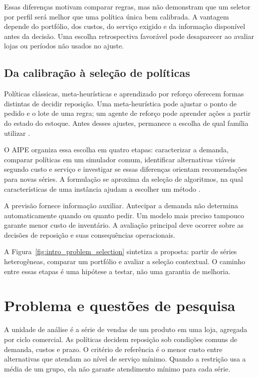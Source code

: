 Essas diferenças motivam comparar regras, mas não demonstram que um seletor por perfil será melhor que uma política única bem calibrada. A vantagem depende do portfólio, dos custos, do serviço exigido e da informação disponível antes da decisão. Uma escolha retrospectiva favorável pode desaparecer ao avaliar lojas ou períodos não usados no ajuste.

\subsection{Da calibração à seleção de políticas}

Políticas clássicas, meta-heurísticas e aprendizado por reforço oferecem formas distintas de decidir reposição. Uma meta-heurística pode ajustar o ponto de pedido e o lote de uma regra; um agente de reforço pode aprender ações a partir do estado do estoque. Antes desses ajustes, permanece a escolha de qual família utilizar \citep{Syntetos2009InventoryForecastingReview,Boute2022DRLInventoryRoadmap}.

O AIPE organiza essa escolha em quatro etapas: caracterizar a demanda, comparar políticas em um simulador comum, identificar alternativas viáveis segundo custo e serviço e investigar se essas diferenças orientam recomendações para novas séries. A formulação se aproxima da seleção de algoritmos, na qual características de uma instância ajudam a escolher um método \citep{Rice1976AlgorithmSelection,Kotthoff2014AlgorithmSelection}.

A previsão fornece informação auxiliar. Antecipar a demanda não determina automaticamente quando ou quanto pedir. Um modelo mais preciso tampouco garante menor custo de inventário. A avaliação principal deve ocorrer sobre as decisões de reposição e suas consequências operacionais.

A Figura~\ref{fig:intro_problem_selection} sintetiza a proposta: partir de séries heterogêneas, comparar um portfólio e avaliar a seleção contextual. O caminho entre essas etapas é uma hipótese a testar, não uma garantia de melhoria.



\section{Problema e questões de pesquisa}

A unidade de análise é a série de vendas de um produto em uma loja, agregada por ciclo comercial. As políticas decidem reposição sob condições comuns de demanda, custos e prazo. O critério de referência é o menor custo entre alternativas que atendam ao nível de serviço mínimo. Quando a restrição usa a média de um grupo, ela não garante atendimento mínimo para cada série.

